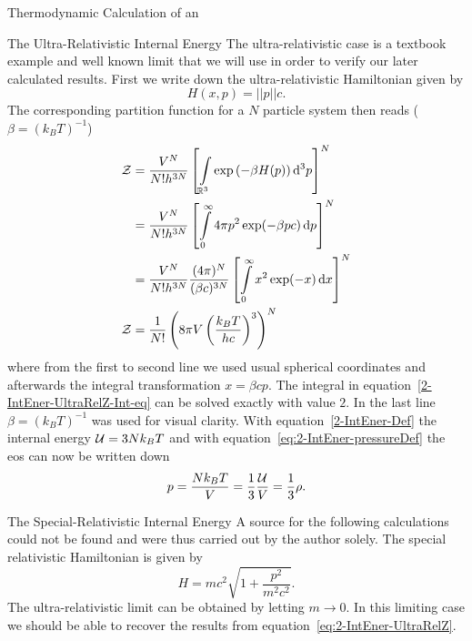 \begin{section}{Thermodynamic Calculation of an \texorpdfstring{}{EoS}}
\begin{subsection}{The Ultra-Relativistic Internal Energy}
The ultra-relativistic case is a textbook example and well known limit that we will use in order to verify our later calculated results. 
First we write down the ultra-relativistic Hamiltonian given by 
\begin{equation}
	H(x,p)=||p||c.
	\label{eq:2-IntEner-Ultra-Rel-Hamiltonian}
\end{equation}
The corresponding partition function for a $N$ particle system then reads ($\beta=(k_B T)^{-1}$)
\begin{align}
	\mathcal{Z} 	&= \frac{V^N}{N!h^{3N}}\left[\int\limits_{\mathbb{R}^3}\exp\left(- \beta H(p)\right)\mathop{}\!\mathrm{d}^3 p\right]^N\\
		&= \frac{V^N}{N!h^{3N}}\left[\int\limits_0^\infty4\pi p^2\exp(-\beta pc) \mathop{}\!\mathrm{d} p\right]^N\\
		&= \frac{V^N}{N!h^{3N}}\frac{(4\pi)^N}{(\beta c)^{3N}}\left[\int\limits_0^\infty x^2\exp(-x) \mathop{}\!\mathrm{d} x\right]^N\label{2-IntEner-UltraRelZ-Int-eq}\\
	\mathcal{Z}	&= \frac{1}{N!}\left(8\pi V\left(\frac{k_B T}{hc}\right)^3\right)^N
	\label{eq:2-IntEner-UltraRelZ}
\end{align}
where from the first to second line we used usual spherical coordinates and afterwards the integral transformation $x=\beta cp$.
The integral in equation~\eqref{2-IntEner-UltraRelZ-Int-eq} can be solved exactly with value $2$.
In the last line $\beta=(k_B T)^{-1}$ was used for visual clarity.
With equation~\eqref{2-IntEner-Def} the internal energy $\mathcal{U} = 3Nk_B T$ and with equation~\eqref{eq:2-IntEner-pressureDef} the \ac{eos} can now be written down
\begin{equation}
	p = \frac{Nk_B T}{V} = \frac{1}{3}\frac{\mathcal{U}}{V} = \frac{1}{3}\rho.
	\label{eq:2-IntEner-eos-nonrel}
\end{equation}
\end{subsection}
%
%
%
\begin{subsection}{The Special-Relativistic Internal Energy}
A source for the following calculations could not be found and were thus carried out by the author solely.
The special relativistic Hamiltonian is given by
\begin{equation}
	H=mc^2\sqrt{1+\frac{p^2}{m^2 c^2}}.
	\label{eq:2-IntEner-Rel-Hamiltonian}
\end{equation}
The ultra-relativistic limit can be obtained by letting $m\rightarrow0$.
In this limiting case we should be able to recover the results from equation~\eqref{eq:2-IntEner-UltraRelZ}.
\begin{align}

\end{align}
\end{subsection}
\end{section}
